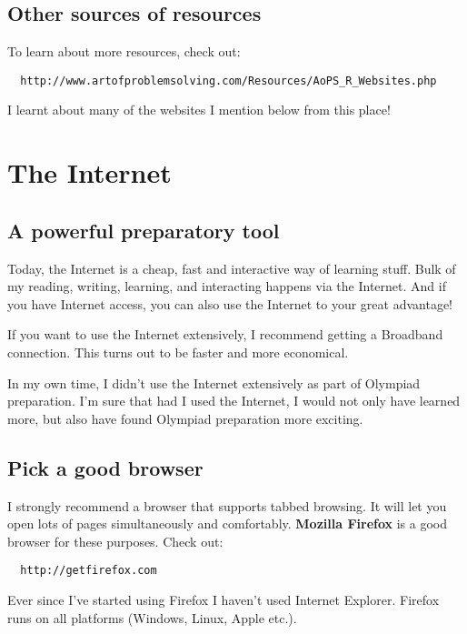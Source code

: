 \documentclass[a4paper]{amsart}
\begin{document}
\subsection{Other sources of resources}

To learn about more resources, check out:

\begin{verbatim}
  http://www.artofproblemsolving.com/Resources/AoPS_R_Websites.php
\end{verbatim}

I learnt about many of the websites I mention below from this place!

\section{The Internet}

\subsection{A powerful preparatory tool}

Today, the Internet is a cheap, fast and interactive way of learning stuff. Bulk of my
reading, writing, learning, and interacting happens via the Internet. And if you have Internet access, you can also use the Internet
to your great advantage!

If you want to use the Internet extensively, I recommend getting a Broadband connection. This turns out to be 
faster and more economical.

In my own time, I didn't use the Internet extensively as part of Olympiad preparation. I'm sure that had I used the Internet, I would not
only have learned more, but also have found Olympiad preparation more exciting.

\subsection{Pick a good browser}

I strongly recommend a browser that supports tabbed browsing. 
It will let you open lots of pages simultaneously and comfortably.
{\bf Mozilla Firefox} is a good browser for these purposes. Check out:

\begin{verbatim}
  http://getfirefox.com
\end{verbatim}

Ever since I've started using Firefox I haven't used Internet Explorer. Firefox runs on all platforms (Windows, Linux, Apple etc.).
\end{document}
